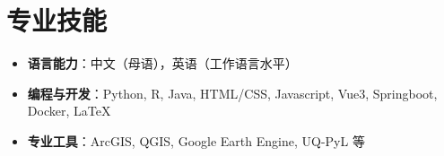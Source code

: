 \documentclass[a4paper,11pt]{article}
\newcommand{\cvitem}[1]{
  \item {\small #1}
}
\begin{document}
\section{专业技能}
\begin{itemize}[leftmargin=0.15in,label={$\bullet$},itemsep=2pt]
  \cvitem{\textbf{语言能力}：中文（母语），英语（工作语言水平）}
  \cvitem{\textbf{编程与开发}：Python, R, Java, HTML/CSS, Javascript, Vue3, Springboot, Docker, \LaTeX}
  \cvitem{\textbf{专业工具}：ArcGIS, QGIS, Google Earth Engine, UQ-PyL 等}
\end{itemize}
\end{document}
